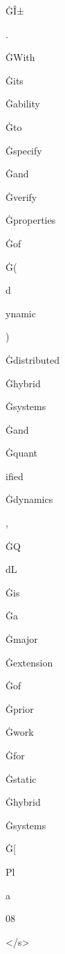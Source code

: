 \documentclass[varwidth]{standalone}
\begin{document}
\begin{CJK*}{UTF8}{gbsn}
{{{\colorbox{red!0.23290417}{\strut ĠÎ±} \colorbox{red!2.8403423}{\strut .} \colorbox{red!0.33103055}{\strut ĠWith} \colorbox{red!0.43619722}{\strut Ġits} \colorbox{red!0.28188744}{\strut Ġability} \colorbox{red!0.13932623}{\strut Ġto} \colorbox{red!0.43007725}{\strut Ġspecify} \colorbox{red!0.12516277}{\strut Ġand} \colorbox{red!0.5152316}{\strut Ġverify} \colorbox{red!0.19803093}{\strut Ġproperties} \colorbox{red!0.14611617}{\strut Ġof} \colorbox{red!0.16534203}{\strut Ġ(} \colorbox{red!0.008747811}{\strut d} \colorbox{red!0.119687445}{\strut ynamic} \colorbox{red!0.112290844}{\strut )} \colorbox{red!0.23316467}{\strut Ġdistributed} \colorbox{red!0.21621494}{\strut Ġhybrid} \colorbox{red!0.10426551}{\strut Ġsystems} \colorbox{red!0.21384272}{\strut Ġand} \colorbox{red!0.09925821}{\strut Ġquant} \colorbox{red!0.022824103}{\strut ified} \colorbox{red!0.11972998}{\strut Ġdynamics} \colorbox{red!0.3477551}{\strut ,} \colorbox{red!0.08131535}{\strut ĠQ} \colorbox{red!0.17269742}{\strut dL} \colorbox{red!0.26680917}{\strut Ġis} \colorbox{red!0.18896395}{\strut Ġa} \colorbox{red!0.2086184}{\strut Ġmajor} \colorbox{red!0.21276486}{\strut Ġextension} \colorbox{red!0.11360651}{\strut Ġof} \colorbox{red!0.4180797}{\strut Ġprior} \colorbox{red!0.6322932}{\strut Ġwork} \colorbox{red!0.23197338}{\strut Ġfor} \colorbox{red!0.16620316}{\strut Ġstatic} \colorbox{red!0.17042314}{\strut Ġhybrid} \colorbox{red!0.07312083}{\strut Ġsystems} \colorbox{red!0.21068487}{\strut Ġ[} \colorbox{red!0.066062406}{\strut Pl} \colorbox{red!0.051833432}{\strut a} \colorbox{red!0.1446353}{\strut 08} \colorbox{red!0.32982668}{\strut </s>} 
}}}
\end{CJK*}
\end{document}
